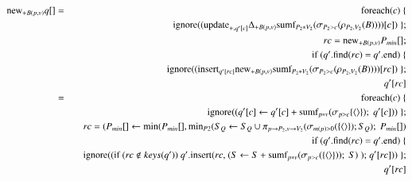 \documentclass{article}
\newcommand{\tuple}[1]{{\langle#1\rangle}}
\begin{document}
\begin{eqnarray*}
\algnew_{+B(p,v)} q[]
&=&\algfor(\mbox{$c$}) \; \{ \\
&&\quad \mathrm{ignore}((\algupdate_{+, q'[c]} \Delta_{+B(p,v)} \algsumf_{P_2 * V_2}(\sigma_{P_2 > c} (\rho_{P_2 , V_2}(B))))[c]) \; \};
\\
&& rc = \algnew_{+B(p,v)} P_{min}[];
\\
&& \mbox{if ($q'$.find($rc$) = $q'$.end)}
\; \{\\
&&\quad \mathrm{ignore}((\alginsert_{q'[rc]} \algnew_{+B(p,v)} \algsumf_{P_2 * V_2}(\sigma_{P_2 > c} (\rho_{P_2 , V_2}(B))))[rc]) \; \};
\\
&& q'[rc]
\\
&=&\algfor(\mbox{$c$}) \; \{ \\
&&\quad \mathrm{ignore}((q'[c] \leftarrow q'[c] + \algsumf_{p * v} (\sigma_{p > c} \{\tuple{}\});\; q'[c])) \; \};
\\
&& rc = ( P_{min}[] \leftarrow \algmin(P_{min}[], \algmin_{P2} (S_Q \leftarrow S_Q \cup \pi_{p \rightarrow P_2, v \rightarrow V_2} (\sigma_{m(p) >0} (\{\tuple{}\});S_Q);\;P_{min}[])
\\
&& \mbox{if ($q'$.find($rc$) = $q'$.end)}
\; \{\\
&&\quad \mathrm{ignore}((\mbox{if ($rc \notin keys(q')$)}  
\mbox{ $q'$.insert($rc$, ($S \leftarrow S + \algsumf_{p * v}(\sigma_{p > c} (\{\tuple{}\} ));\;S)\;);$}\;q'[rc])) \; \};
\\
&& q'[rc]
\\
\end{eqnarray*}
\end{document}
